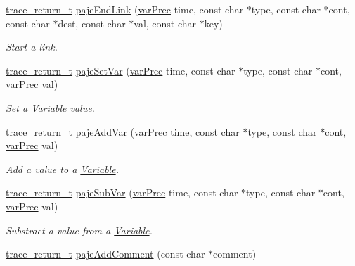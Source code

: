 \begin{DoxyCompactItemize}
\hyperlink{group__type_ga1f1b68fb37d7331f03a48ef0993a0788}{trace\-\_\-return\-\_\-t} \hyperlink{group__cpaje_ga41f1c6499787f834904580c315032258}{paje\-End\-Link} (\hyperlink{group__type_gabda13d5bcd0cbdb094d655181a857e25}{var\-Prec} time, const char $\ast$type, const char $\ast$cont, const char $\ast$dest, const char $\ast$val, const char $\ast$key)
\begin{DoxyCompactList}\small\item\em Start a link. \end{DoxyCompactList}\item 
\hyperlink{group__type_ga1f1b68fb37d7331f03a48ef0993a0788}{trace\-\_\-return\-\_\-t} \hyperlink{group__cpaje_ga3729690fc4d61c7f74e780530113fd8a}{paje\-Set\-Var} (\hyperlink{group__type_gabda13d5bcd0cbdb094d655181a857e25}{var\-Prec} time, const char $\ast$type, const char $\ast$cont, \hyperlink{group__type_gabda13d5bcd0cbdb094d655181a857e25}{var\-Prec} val)
\begin{DoxyCompactList}\small\item\em Set a \hyperlink{structVariable}{Variable} value. \end{DoxyCompactList}\item 
\hyperlink{group__type_ga1f1b68fb37d7331f03a48ef0993a0788}{trace\-\_\-return\-\_\-t} \hyperlink{group__cpaje_ga6f1f9c069de829e3c2791415af7212d4}{paje\-Add\-Var} (\hyperlink{group__type_gabda13d5bcd0cbdb094d655181a857e25}{var\-Prec} time, const char $\ast$type, const char $\ast$cont, \hyperlink{group__type_gabda13d5bcd0cbdb094d655181a857e25}{var\-Prec} val)
\begin{DoxyCompactList}\small\item\em Add a value to a \hyperlink{structVariable}{Variable}. \end{DoxyCompactList}\item 
\hyperlink{group__type_ga1f1b68fb37d7331f03a48ef0993a0788}{trace\-\_\-return\-\_\-t} \hyperlink{group__cpaje_gacf05b63d86f1f7e36602347f56d1640d}{paje\-Sub\-Var} (\hyperlink{group__type_gabda13d5bcd0cbdb094d655181a857e25}{var\-Prec} time, const char $\ast$type, const char $\ast$cont, \hyperlink{group__type_gabda13d5bcd0cbdb094d655181a857e25}{var\-Prec} val)
\begin{DoxyCompactList}\small\item\em Substract a value from a \hyperlink{structVariable}{Variable}. \end{DoxyCompactList}\item 
\hyperlink{group__type_ga1f1b68fb37d7331f03a48ef0993a0788}{trace\-\_\-return\-\_\-t} \hyperlink{group__cpaje_gaaf3eb514831a8ac2a301c43236b6dd04}{paje\-Add\-Comment} (const char $\ast$comment)

\end{DoxyCompactItemize}
